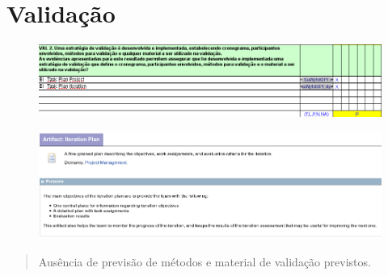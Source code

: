 \section{Validação} %
\label{sec:valida_o}

\begin{frame}
\begin{figure}[p]
    \centering
    \includegraphics[width=\textwidth]{conteudo/VAL2}
    \label{fig:Pattern}
\end{figure}	
\end{frame}
\begin{frame}
\begin{figure}[p]
    \centering
    \includegraphics[width=\textwidth]{conteudo/plan}
    \label{fig:Pattern}
\end{figure}	
\begin{quote}
Ausência de previsão de métodos e material de validação previstos.
\end{quote}
\end{frame}


